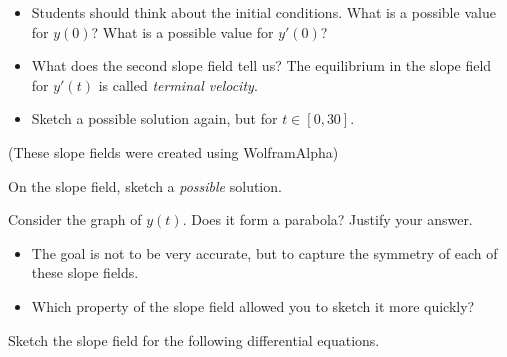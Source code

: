 \begin{annotation}
\begin{goals}
	\begin{itemize}
		\item Students should think about the initial conditions.
		What is a possible value for $y(0)$? What is a possible value for $y'(0)$? \\

		\item What does the second slope field tell us? The equilibrium in the slope field for $y'(t)$ is called \emph{terminal velocity}.
		\item Sketch a possible solution again, but for $t\in[0,30]$.
	\end{itemize}
\end{goals}	
\end{annotation}
\hfill {\footnotesize(These slope fields were created using WolframAlpha)} \\

\begin{parts}
	\item On the slope field, sketch a \emph{possible} solution.	
	\item Consider the graph of $y(t)$. Does it form a parabola? Justify your answer.
\end{parts}






\newpage



\begin{annotation}
	\begin{goals}
		\begin{itemize}
			\item The goal is not to be very accurate, but to capture the symmetry of each of these slope fields.
			\item Which property of the slope field allowed you to sketch it more quickly?
		\end{itemize}
	\end{goals}
\end{annotation}
\question Sketch the slope field for the following differential equations. 

